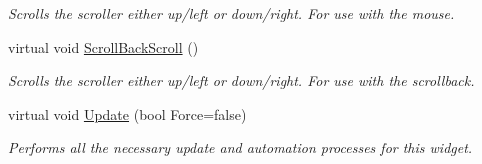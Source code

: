 \begin{DoxyCompactItemize}
\begin{DoxyCompactList}\small\item\em Scrolls the scroller either up/left or down/right. For use with the mouse. \item\end{DoxyCompactList}\item 
\hypertarget{classphys_1_1UI_1_1Scrollbar_a1c6ca6b135d09d284b31fda2230c9286}{
virtual void \hyperlink{classphys_1_1UI_1_1Scrollbar_a1c6ca6b135d09d284b31fda2230c9286}{ScrollBackScroll} ()}
\label{classphys_1_1UI_1_1Scrollbar_a1c6ca6b135d09d284b31fda2230c9286}

\begin{DoxyCompactList}\small\item\em Scrolls the scroller either up/left or down/right. For use with the scrollback. \item\end{DoxyCompactList}\item 
\hypertarget{classphys_1_1UI_1_1Scrollbar_a628999b4caa32f3c273d45e64d5c62a0}{
virtual void \hyperlink{classphys_1_1UI_1_1Scrollbar_a628999b4caa32f3c273d45e64d5c62a0}{Update} (bool Force=false)}
\label{classphys_1_1UI_1_1Scrollbar_a628999b4caa32f3c273d45e64d5c62a0}

\begin{DoxyCompactList}\small\item\em Performs all the necessary update and automation processes for this widget. \item\end{DoxyCompactList}\end{DoxyCompactItemize}
